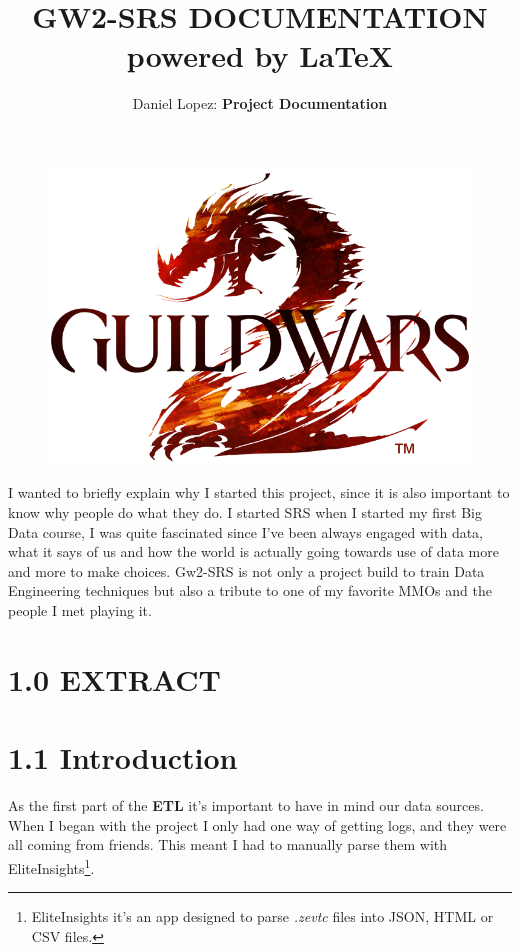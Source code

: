 \documentclass[12pt,a4paper]{article}
\title{%
    \vspace*{-5mm}\Huge GW2-SRS DOCUMENTATION \\
    \vspace*{2mm}\Large powered by \LaTeX}
\author{\vspace*{-5mm}\large Daniel Lopez: \textbf{Project Documentation}}
\begin{document}
    \maketitle

    \begin{figure}[H]
        \centering
        \includegraphics[width=1 \textwidth]{Images/Nuevo_logo_GW2.png}
    \end{figure}

    \newpage

    \begin{tcolorbox}
        I wanted to briefly explain why I started this project, since it is also important to
        know why people do what they do. I started SRS when I started my first Big Data course, I
        was quite fascinated since I've been always engaged with data, what it says of us and how
        the world is actually going towards use of data more and more to make choices. Gw2-SRS is
        not only a project build to train Data Engineering techniques but also a tribute to one of 
        my favorite MMOs and the people I met playing it.
    \end{tcolorbox}

    \section*{1.0 EXTRACT}

    \section*{\large 1.1 Introduction}
    As the first part of the \textbf{ETL} it's important to have in mind our data sources. When
    I began with the project I only had one way of getting logs, and they were all coming
    from friends. This meant I had to manually parse them with EliteInsights\footnote{EliteInsights it's an app designed to parse \textit{.zevtc} files into JSON, HTML or CSV files.}. 
\end{document}
